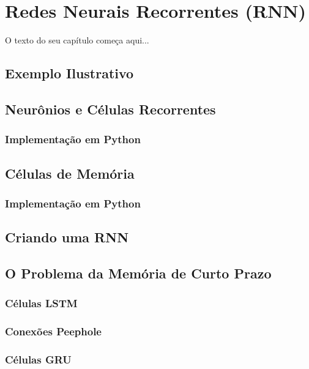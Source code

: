 
\chapter{Redes Neurais Recorrentes (RNN)}
\label{cap:rnn}

O texto do seu capítulo começa aqui...


\section{Exemplo Ilustrativo}

\section{Neurônios e Células Recorrentes}

\subsection{Implementação em Python}

\section{Células de Memória}

\subsection{Implementação em Python}

\section{Criando uma RNN}

\section{O Problema da Memória de Curto Prazo}

\subsection{Células LSTM}

\subsection{Conexões Peephole}

\subsection{Células GRU}